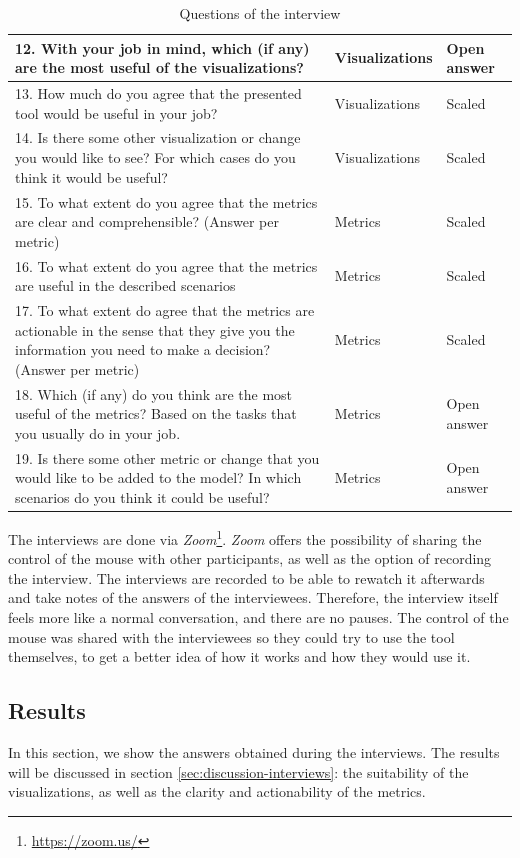\begin{table}[p]
\begin{center}
\begin{tabularx}{\textwidth}{|X|l|l|}
    12.	With your job in mind, which (if any) are the most useful of the visualizations? & Visualizations & Open answer \\\hline
    13.	How much do you agree that the presented tool would be useful in your job? & Visualizations & Scaled \\\hline
    14.	Is there some other visualization or change you would like to see? For which cases do you think it would be useful? & Visualizations & Scaled \\\hline
    \hline
    15.	To what extent do you agree that the metrics are clear and comprehensible? (Answer per metric) & Metrics & Scaled \\\hline
    16.	To what extent do you agree that the metrics are useful in the described scenarios & Metrics & Scaled \\\hline
    17.	To what extent do agree that the metrics are actionable in the sense that they give you the information you need to make a decision? (Answer per metric) & Metrics & Scaled \\\hline
    18.	Which (if any) do you think are the most useful of the metrics? Based on the tasks that you usually do in your job. & Metrics & Open answer \\\hline
    19.	Is there some other metric or change that you would like to be added to the model? In which scenarios do you think it could be useful? & Metrics & Open answer \\\hline
    \end{tabularx}
    \end{center}
    \caption{Questions of the interview}
    \label{table:interview-questions}
\end{table}

The interviews are done via \textit{Zoom}\footnote{\url{https://zoom.us/}}. \textit{Zoom} offers the possibility of sharing the control of the mouse with other participants, as well as the option of recording the interview. The interviews are recorded to be able to rewatch it afterwards and take notes of the answers of the interviewees. Therefore, the interview itself feels more like a normal conversation, and there are no pauses. The control of the mouse was shared with the interviewees so they could try to use the tool themselves, to get a better idea of how it works and how they would use it.

\subsection{Results}
In this section, we show the answers obtained during the interviews. The results will be discussed in section \ref{sec:discussion-interviews}: the suitability of the visualizations, as well as the clarity and actionability of the metrics.

